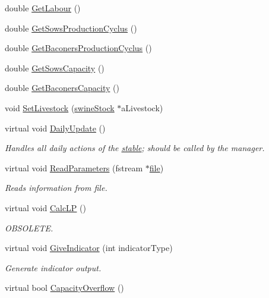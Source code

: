 \begin{DoxyCompactItemize}
double \hyperlink{classpigstable_ac14a3ded55664bd4c44841044e787d15}{GetLabour} ()
\item 
double \hyperlink{classpigstable_a66c14d2be32d4dba34a32ece913a3073}{GetSowsProductionCyclus} ()
\item 
double \hyperlink{classpigstable_a68a621406eb37f6ec5c701da6a08573a}{GetBaconersProductionCyclus} ()
\item 
double \hyperlink{classpigstable_aabcb52218fd513e64a754db978910ac5}{GetSowsCapacity} ()
\item 
double \hyperlink{classpigstable_a44362a0d046f2c41ac1603e953b8f471}{GetBaconersCapacity} ()
\item 
void \hyperlink{classpigstable_a9ad970c3d281c92caea8010ac353bbd1}{SetLivestock} (\hyperlink{classswine_stock}{swineStock} $\ast$aLivestock)
\item 
virtual void \hyperlink{classpigstable_a0339646d96e17f62b6e745be279ec633}{DailyUpdate} ()
\begin{DoxyCompactList}\small\item\em Handles all daily actions of the \hyperlink{classstable}{stable}; should be called by the manager. \item\end{DoxyCompactList}\item 
virtual void \hyperlink{classpigstable_aa31308b795d7a454e5156e8c2f49fe47}{ReadParameters} (fstream $\ast$\hyperlink{classbase_a3af52ee9891719d09b8b19b42450b6f6}{file})
\begin{DoxyCompactList}\small\item\em Reads information from file. \item\end{DoxyCompactList}\item 
virtual void \hyperlink{classpigstable_aff8c1aa84a8727d9a5c6d060bf6fe323}{CalcLP} ()
\begin{DoxyCompactList}\small\item\em OBSOLETE. \item\end{DoxyCompactList}\item 
virtual void \hyperlink{classpigstable_a809943d3ff6f8314d92bfc1b29dec8af}{GiveIndicator} (int indicatorType)
\begin{DoxyCompactList}\small\item\em Generate indicator output. \item\end{DoxyCompactList}\item 
virtual bool \hyperlink{classpigstable_a952f12bb06ab3080002183709010b0e9}{CapacityOverflow} ()

\end{DoxyCompactItemize}
